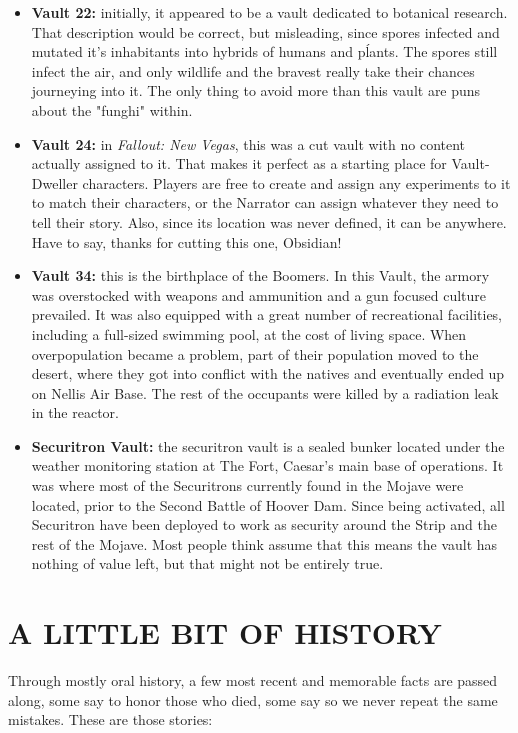 \documentclass[11pt]{article} %
\begin{document}
\begin{itemize}
	\item \textbf{Vault 22:} initially, it appeared to be a vault dedicated to botanical research. That description would be correct, but misleading, since spores infected and mutated it's inhabitants into hybrids of humans and pĺants. The spores still infect the air, and only wildlife and the bravest really take their chances journeying into it. The only thing to avoid more than this vault are puns about the "funghi" within.
	
	\item \textbf{Vault 24:} in \textit{Fallout: New Vegas}, this was a cut vault with no content actually assigned to it. That makes it perfect as a starting place for Vault-Dweller characters. Players are free to create and assign any experiments to it to match their characters, or the Narrator can assign whatever they need to tell their story. Also, since its location was never defined, it can be anywhere. Have to say, thanks for cutting this one, Obsidian!
	
	\item \textbf{Vault 34:} this is the birthplace of the Boomers. In this Vault, the armory was overstocked with weapons and ammunition and a gun focused culture prevailed. It was also equipped with a great number of recreational facilities, including a full-sized swimming pool, at the cost of living space. When overpopulation became a problem, part of their population moved to the desert, where they got into conflict with the natives and eventually ended up on Nellis Air Base. The rest of the occupants were killed by a radiation leak in the reactor.
	
	\item \textbf{Securitron Vault:} the securitron vault is a sealed bunker located under the weather monitoring station at The Fort, Caesar's main base of operations. It was where most of the Securitrons currently found in the Mojave were located, prior to the Second Battle of Hoover Dam. Since being activated, all Securitron have been deployed to work as security around the Strip and the rest of the Mojave. Most people think assume that this means the vault has nothing of value left, but that might not be entirely true.
\end{itemize}


\section{A LITTLE BIT OF HISTORY}

Through mostly oral history, a few most recent and memorable facts are passed along, some say to honor those who died, some say so we never repeat the same mistakes. These are those stories:
\end{document}
